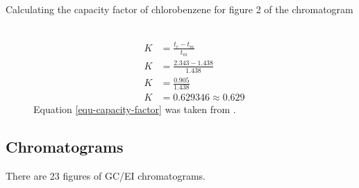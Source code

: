 \documentclass[a4paper, 12pt]{article}
\begin{document}
\begin{description}
	\item[Calculating the capacity factor of chlorobenzene for figure 2 of the chromatogram] \hfill \\
		\begin{equation} \label{equ-capacity-factor}
			\begin{split}
				K & = \frac{t_r - t_m}{t_m} \\
				K & = \frac{2.343 - 1.438}{1.438} \\
				K & = \frac{0.905}{1.438} \\
				K & = 0.629346 \approx 0.629
			\end{split}
		\end{equation}
		Equation \ref{equ-capacity-factor} was taken from \cite{harris}.

\end{description}


\subsection{Chromatograms}
There are 23 figures of GC/EI chromatograms.

\end{document}
